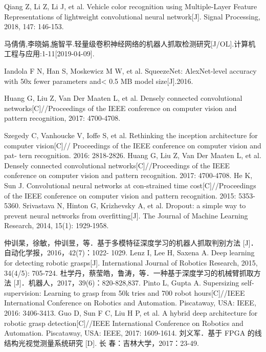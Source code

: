 \documentclass[no-math, withoutpreface]{YangThesis}
\begin{document}
\begin{thebibliography}{9}
 Qiang Z, Li Z, Li J, et al. Vehicle color recognition using
Multiple-Layer Feature Representations of lightweight convolutional neural network[J]. Signal Processing, 2018, 147: 146-153. 

  马倩倩,李晓娟,施智平.轻量级卷积神经网络的机器人抓取检测研究[J/OL].计算机工程与应用:1-11[2019-04-09].
 
  Iandola F N, Han S, Moskewicz M W, et al. SqueezeNet: AlexNet-level accuracy with 50x fewer parameters and<
0.5 MB model size[J].2016.

  Huang G, Liu Z, Van Der Maaten L, et al. Densely connected convolutional networks[C]//Proceedings of the IEEE conference on computer vision and pattern recognition, 2017: 4700-4708.

  Szegedy C, Vanhoucke V, Ioffe S, et al. Rethinking the inception architecture for computer vision[C]// Proceedings of the IEEE conference on computer vision and pat- tern recognition. 2016: 2818-2826.
  Huang G, Liu Z, Van Der Maaten L, et al. Densely connected convolutional networks[C]//Proceedings of the IEEE conference on computer vision and pattern recognition. 2017: 4700-4708.
  He K, Sun J. Convolutional neural networks at con-strained time cost[C]//Proceedings of the IEEE conference on computer vision and pattern recognition. 2015: 5353-5360.
  Srivastava N, Hinton G, Krizhevsky A, et al. Dropout: a simple way to prevent neural networks from overfitting[J]. The Journal of Machine Learning Research, 2014, 15(1): 1929-1958.

   仲训杲，徐敏，仲训昱，等．基于多模特征深度学习的机器人抓取判别方法 [J]．自动化学报，2016，42(7)：1022- 1029.
 Lenz I, Lee H, Saxena A. Deep learning for detecting robotic grasps[J]. International Journal of Robotics Research, 2015, 34(4/5): 705-724.
   杜学丹，蔡莹皓，鲁涛，等．一种基于深度学习的机械臂抓取方法  [J]．机器人，2017，39(6)：820-828,837.
 Pinto L, Gupta A. Supersizing self-supervision: Learning to grasp from 50k tries and 700 robot hours[C]//IEEE International Conference on Robotics and Automation. Piscataway, USA: IEEE, 2016: 3406-3413.
 Guo D, Sun F C, Liu H P, et al. A hybrid deep architecture for robotic grasp detection[C]//IEEE International Conference on Robotics and Automation. Piscataway, USA: IEEE, 2017: 1609-1614.
 刘义军．基于 FPGA 的线结构光视觉测量系统研究 [D]. 长 春：吉林大学，2017：23-49.


\end{thebibliography}
\end{document}
